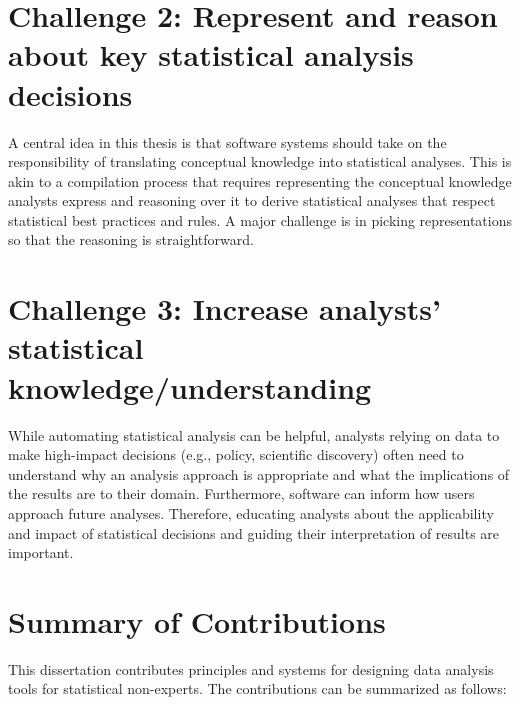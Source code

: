 \section*{Challenge 2: Represent and reason about key statistical analysis decisions} %
A central idea in this thesis is that software systems should take on the
responsibility of translating conceptual knowledge into statistical analyses.
This is akin to a compilation process that requires representing the conceptual
knowledge analysts express and reasoning over it to derive statistical
analyses that respect statistical best practices and rules. A
major challenge is in picking representations so that the reasoning is straightforward. 

\section*{Challenge 3: Increase analysts' statistical knowledge/understanding} %
While automating statistical analysis can be helpful, analysts relying on data
to make high-impact decisions (e.g., policy, scientific discovery) often need to
understand why an analysis approach is appropriate and what the implications of
the results are to their domain. Furthermore, software can inform how users
approach future analyses. Therefore, educating analysts about the applicability
and impact of statistical decisions and guiding their interpretation of results
are important.

\section{Summary of Contributions}
This dissertation contributes principles and systems for designing data analysis
tools for statistical non-experts. The contributions can be summarized as follows: 

